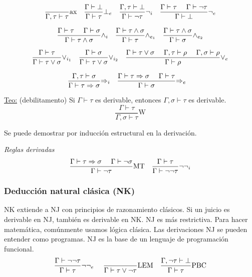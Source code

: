 \documentclass[12pt]{extarticle}
\def\teorema{\underline{Teo:} }
\def\ssspace{\space\space\space}
\newcommand\Regla[3]{\frac{\text{#3}}{\text{#2}} \text{#1}}
\begin{document}
$$
\Regla{ax\ssspace}{$\Gamma, \tau \vdash \tau$}{}
\Regla{$\bot_e$\ssspace}{$\Gamma \vdash \tau$}{$\Gamma \vdash \bot$}
\Regla{$\neg_i$\ssspace}{$\Gamma \vdash \neg \tau$}{$\Gamma, \tau \vdash \bot$}
\Regla{$\neg_e$}{$\Gamma \vdash \bot$}{$\Gamma \vdash \tau$ \ssspace $\Gamma \vdash \neg \tau$}
$$

$$
\Regla{$\land_i$\ssspace}{$\Gamma \vdash \tau \land \sigma$}{$\Gamma \vdash \tau$ \ssspace $\Gamma \vdash \sigma$}
\Regla{$\land_{e_1}$\ssspace}{$\Gamma \vdash \tau$}{$\Gamma \vdash \tau \land \sigma$}
\Regla{$\land_{e_2}$}{$\Gamma \vdash \sigma$}{$\Gamma \vdash \tau \land \sigma$}
$$

$$
\Regla{$\lor_{i_1}$\ssspace}{$\Gamma \vdash \tau \lor \sigma$}{$\Gamma \vdash \tau$}
\Regla{$\lor_{i_2}$\ssspace}{$\Gamma \vdash \tau \lor \sigma$}{$\Gamma \vdash \sigma$}
\Regla{$\lor_e$}{$\Gamma \vdash \rho$}{$\Gamma \vdash \tau \lor \sigma$ \ssspace $\Gamma, \tau \vdash \rho$ \ssspace $\Gamma, \sigma \vdash \rho$}
$$

$$
\Regla{$\Rightarrow_i$\ssspace}{$\Gamma \vdash \tau \Rightarrow \sigma$}{$\Gamma, \tau \vdash \sigma$}
\Regla{$\Rightarrow_e$\ssspace}{$\Gamma \vdash \sigma$}{$\Gamma \vdash \tau \Rightarrow \sigma$ \ssspace $\Gamma \vdash \tau$}
$$

\teorema (debilitamento) Si $\Gamma \vdash \tau$ es derivable, entonces $\Gamma, \sigma \vdash \tau$ es derivable.
$$ \Regla{W}{$\Gamma, \sigma \vdash \tau$}{$\Gamma \vdash \tau$} $$

Se puede demostrar por inducción estructural en la derivación.

\textit{Reglas derivadas}
$$
\Regla{MT\ssspace}{$\Gamma \vdash \neg \tau$}{$\Gamma \vdash \tau \Rightarrow \sigma$ \ssspace $\Gamma \vdash \neg \sigma$}
\Regla{$\neg \neg_i$}{$\Gamma \vdash \neg \neg \tau$}{$\Gamma \vdash \tau$}
$$

\subsubsection{Deducción natural clásica (NK)}
NK extiende a NJ con principios de razonamiento clásicos. Si un juicio es derivable en NJ, también es derivable en NK. NJ es más restrictiva. Para hacer matemática, comúnmente usamos lógica clásica. Las derivaciones NJ se pueden entender como programas. NJ es la base de un lenguaje de programación funcional.
$$
\Regla{$\neg \neg_e$ \ssspace}{$\Gamma \vdash \tau$}{$\Gamma \vdash \neg \neg \tau$}
\Regla{LEM\ssspace}{$\Gamma \vdash \tau \lor \neg \tau$}{}
\Regla{PBC}{$\Gamma \vdash \tau$}{$\Gamma, \neg \tau \vdash \bot$}
$$
\end{document}
